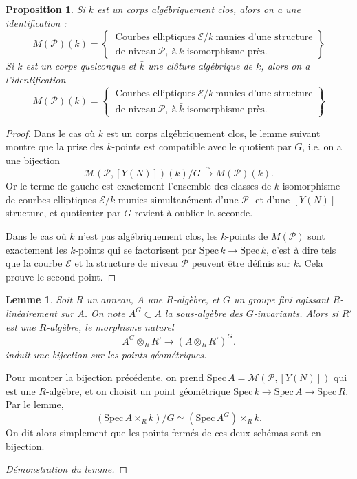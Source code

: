 \documentclass[11pt,a4paper]{article}
\newcommand{\E}{\mathcal{E}}
\renewcommand{\Pr}{\mathcal{P}}
\newcommand{\M}{\mathcal{M}}
\newcommand{\vers}{\longrightarrow}
\newcommand{\Spec}{\mathrm{Spec}\,}
\newtheorem*{lem}{Lemme}
\newtheorem*{prop}{Proposition}
\theoremstyle{definition}
\begin{document}
\begin{prop}
Si $k$ est un corps algébriquement clos, alors on a une identification :
$$ M(\Pr)(k) = 
\left.
\begin{cases}
\ \text{Courbes\ elliptiques}\ \E/k \ \text{munies\ d'une\ structure} \\
\ \text{de\ niveau}\ \Pr,\ \text{à}\ k\text{-isomorphisme\ près}.
\end{cases}
\right\}$$
Si $k$ est un corps quelconque et $\bar{k}$ une clôture algébrique de $k$, alors on a l'identification
$$ M(\Pr)(k) = 
\left.
\begin{cases}
\ \text{Courbes\ elliptiques}\ \E/k \ \text{munies\ d'une\ structure} \\
\ \text{de\ niveau}\ \Pr,\ \text{à}\ \bar{k}\text{-isomorphisme\ près}.
\end{cases}
\right\}$$
\end{prop}

\begin{proof}
Dans le cas où $k$ est un corps algébriquement clos, le lemme suivant montre que la prise des $k$-points est compatible avec le quotient par $G$, i.e. on a une bijection
$$\M(\Pr, [Y(N)])(k)/G \overset{\sim}{\vers} M(\Pr)(k).$$
Or le terme de gauche est exactement l'ensemble des classes de $k$-isomorphisme de courbes elliptiques $\E/k$ munies simultanément d'une $\Pr$- et d'une $[Y(N)]$-structure, et quotienter par $G$ revient à oublier la seconde.

Dans le cas où $k$ n'est pas algébriquement clos, les $k$-points de $M(\Pr)$ sont exactement les $\bar{k}$-points qui se factorisent par $\Spec\bar{k}\vers\Spec k$, c'est à dire tels que la courbe $\E$ et la structure de niveau $\Pr$ peuvent être définis sur $k$. Cela prouve le second point. 
\end{proof}

\begin{lem}
Soit $R$ un anneau, $A$ une $R$-algèbre, et $G$ un groupe fini agissant $R$-linéairement sur $A$. On note $A^G \subset A$ la sous-algèbre des $G$-invariants. Alors si $R'$ est une $R$-algèbre, le morphisme naturel
$$A^G\otimes_R R' \vers (A\otimes_R R')^G.$$
induit une bijection sur les points géométriques.
\end{lem}

Pour montrer la bijection précédente, on prend $\Spec A = \M(\Pr, [Y(N)])$ qui est une $R$-algèbre, et on choisit un point géométrique $\Spec k\vers \Spec A \vers\Spec R$. Par le lemme,
$$(\Spec A \times_R k)/G \simeq (\Spec A^G) \times_R k.$$
On dit alors simplement que les points fermés de ces deux schémas sont en bijection.
\begin{proof}[Démonstration du lemme]

\end{proof}
\end{document}
